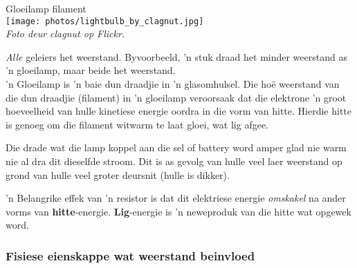 \begin{minipage}{.5\textwidth}
\begin{center}
Gloeilamp filament\\
\texttt{[image: photos/lightbulb\_by\_clagnut.jpg]}\\
\textit{Foto deur clagnut op Flickr.}
\end{center}  
\end{minipage}
\begin{minipage}{.5\textwidth}

\textit{Alle} geleiers het weerstand. Byvoorbeeld, 'n stuk draad het
minder weerstand as 'n gloeilamp, maar beide het weerstand. \\

 'n Gloeilamp is 'n baie dun draadjie in 'n glasomhulsel. Die ho\"e weerstand van
die dun draadjie (filament) in 'n gloeilamp veroorsaak dat die elektrone 'n
groot hoeveelheid van hulle kinetiese energie oordra in die vorm van hitte.
Hierdie hitte is genoeg om die filament witwarm te laat gloei, wat lig afgee.

\end{minipage}

Die drade wat die lamp koppel aan die sel of battery word amper glad nie warm
nie al dra dit dieselfde stroom. Dit is as gevolg van hulle veel laer
weerstand op grond van hulle veel groter deursnit (hulle is dikker).

 'n Belangrike effek van 'n resistor is dat dit elektriese energie
\textit{omskakel} na ander vorms van \textbf{hitte}-energie.
\textbf{Lig}-energie is 'n neweproduk van die hitte wat opgewek word.


\subsubsection{Fisiese eienskappe wat weerstand beinvloed}

